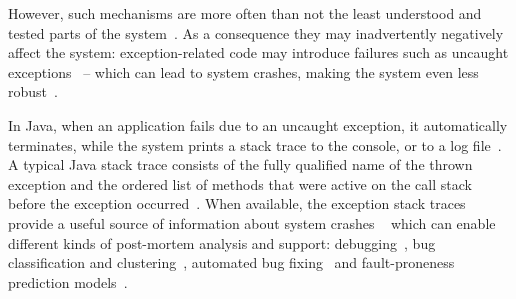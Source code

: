 

However, such mechanisms are more often than not the least 
understood and tested parts of the system~\cite{miller1997issues,Robil00,shah2010understanding, 
garcia2007extracting,garcia2001comparative,cabral2007exception,coelho2011unveiling,yuan:2014.osdi}.
As a consequence they may inadvertently negatively affect the system: exception-related code may introduce failures such as 
uncaught exceptions~\cite{jo2004uncaught, Zhang12} -- 
which can lead to system crashes, making the system even less robust~\cite{coelho2011unveiling}.

In Java, when an application fails due to an uncaught exception, 
it automatically terminates, while the system prints a stack trace to the console, 
or to a log file~\cite{gosling2000java}.  A typical Java stack trace consists of  the fully qualified name 
of the thrown exception and the ordered list of methods that were active on the call stack before 
the exception occurred~\cite{gosling2000java,bloch2008effective}.
When available, the exception stack traces provide a useful source of information about system crashes ~\cite{bettenburg2008makes} which 
can enable different kinds of post-mortem analysis and support:  debugging~\cite{schroter2010stack}, 
bug classification and clustering~\cite{wang2013improving, kim2011crash, dhaliwal2011classifying},  
automated bug fixing~\cite{sinha2009fault} and fault-proneness prediction models~\cite{kim2013predicting}. 



